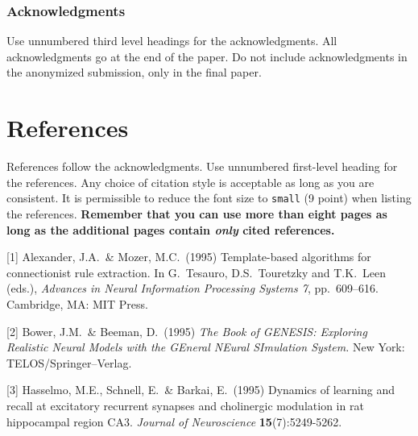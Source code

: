 \documentclass{article}
\begin{document}
\subsubsection*{Acknowledgments}

Use unnumbered third level headings for the acknowledgments. All acknowledgments
go at the end of the paper. Do not include acknowledgments in the anonymized
submission, only in the final paper.

\section*{References}

References follow the acknowledgments. Use unnumbered first-level heading for
the references. Any choice of citation style is acceptable as long as you are
consistent. It is permissible to reduce the font size to \verb+small+ (9 point)
when listing the references. {\bf Remember that you can use more than eight
  pages as long as the additional pages contain \emph{only} cited references.}
\medskip

\small

[1] Alexander, J.A.\ \& Mozer, M.C.\ (1995) Template-based algorithms for
connectionist rule extraction. In G.\ Tesauro, D.S.\ Touretzky and T.K.\ Leen
(eds.), {\it Advances in Neural Information Processing Systems 7},
pp.\ 609--616. Cambridge, MA: MIT Press.

[2] Bower, J.M.\ \& Beeman, D.\ (1995) {\it The Book of GENESIS: Exploring
  Realistic Neural Models with the GEneral NEural SImulation System.}  New York:
TELOS/Springer--Verlag.

[3] Hasselmo, M.E., Schnell, E.\ \& Barkai, E.\ (1995) Dynamics of learning and
recall at excitatory recurrent synapses and cholinergic modulation in rat
hippocampal region CA3. {\it Journal of Neuroscience} {\bf 15}(7):5249-5262.
\end{document}
